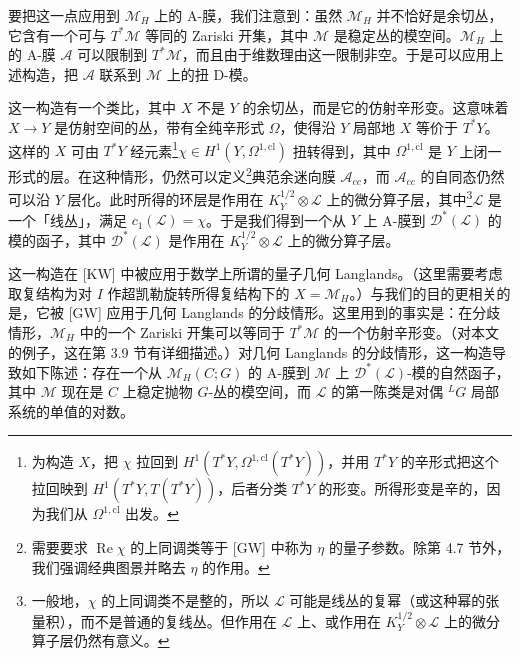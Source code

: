 要把这一点应用到 $\mathcal{M}_H$ 上的 A-膜，我们注意到：虽然 $\mathcal{M}_H$ 并不恰好是余切丛，它含有一个可与 $T^*\mathcal{M}$ 等同的 Zariski 开集，其中 $\mathcal{M}$ 是稳定丛的模空间。$\mathcal{M}_H$ 上的 A-膜 $\mathcal{A}$ 可以限制到 $T^*\mathcal{M}$，而且由于维数理由这一限制非空。于是可以应用上述构造，把 $\mathcal{A}$ 联系到 $\mathcal{M}$ 上的扭 D-模。

这一构造有一个类比，其中 $X$ 不是 $Y$ 的余切丛，而是它的仿射辛形变。这意味着 $X\to Y$ 是仿射空间的丛，带有全纯辛形式 $\Omega$，使得沿 $Y$ 局部地 $X$ 等价于 $T^*Y$。这样的 $X$ 可由 $T^*Y$ 经元素\footnote{为构造 $X$，把 $\chi$ 拉回到 $H^1(T^*Y,\Omega^{1,\mathrm{cl}}(T^*Y))$，并用 $T^*Y$ 的辛形式把这个拉回映到 $H^1(T^*Y,T(T^*Y))$，后者分类 $T^*Y$ 的形变。所得形变是辛的，因为我们从 $\Omega^{1,\mathrm{cl}}$ 出发。}$\chi\in H^1(Y,\Omega^{1,\mathrm{cl}})$ 扭转得到，其中 $\Omega^{1,\mathrm{cl}}$ 是 $Y$ 上闭一形式的层。在这种情形，仍然可以定义\footnote{需要要求 $\operatorname{Re}\chi$ 的上同调类等于 [GW] 中称为 $\eta$ 的量子参数。除第 4.7 节外，我们强调经典图景并略去 $\eta$ 的作用。}典范余迷向膜 $\mathcal{A}_{cc}$，而 $\mathcal{A}_{cc}$ 的自同态仍然可以沿 $Y$ 层化。此时所得的环层是作用在 $K_Y^{1/2}\otimes\mathcal{L}$ 上的微分算子层，其中\footnote{一般地，$\chi$ 的上同调类不是整的，所以 $\mathcal{L}$ 可能是线丛的复幂（或这种幂的张量积），而不是普通的复线丛。但作用在 $\mathcal{L}$ 上、或作用在 $K_Y^{1/2}\otimes\mathcal{L}$ 上的微分算子层仍然有意义。}$\mathcal{L}$ 是一个「线丛」，满足 $c_1(\mathcal{L})=\chi$。于是我们得到一个从 $Y$ 上 A-膜到 $\mathcal{D}^*(\mathcal{L})$ 的模的函子，其中 $\mathcal{D}^*(\mathcal{L})$ 是作用在 $K_Y^{1/2}\otimes\mathcal{L}$ 上的微分算子层。

这一构造在 [KW] 中被应用于数学上所谓的量子几何 Langlands。（这里需要考虑取复结构为对 $I$ 作超凯勒旋转所得复结构下的 $X=\mathcal{M}_H$。）与我们的目的更相关的是，它被 [GW] 应用于几何 Langlands 的分歧情形。这里用到的事实是：在分歧情形，$\mathcal{M}_H$ 中的一个 Zariski 开集可以等同于 $T^*\mathcal{M}$ 的一个仿射辛形变。（对本文的例子，这在第 3.9 节有详细描述。）对几何 Langlands 的分歧情形，这一构造导致如下陈述：存在一个从 $\mathcal{M}_H(C;G)$ 的 A-膜到 $\mathcal{M}$ 上 $\mathcal{D}^*(\mathcal{L})$-模的自然函子，其中 $\mathcal{M}$ 现在是 $C$ 上稳定抛物 $G$-丛的模空间，而 $\mathcal{L}$ 的第一陈类是对偶 ${}^{L}G$ 局部系统的单值的对数。


